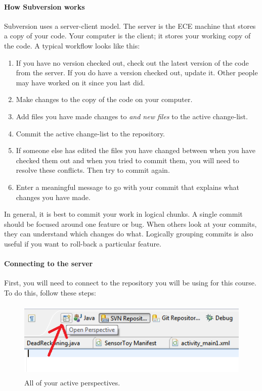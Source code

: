 \documentclass[10pt]{article}
\begin{document}
\paragraph{How Subversion works} Subversion uses a server-client model. The server is the ECE machine that stores a copy of your code. Your computer is the client; it stores your working copy of the code. A typical workflow looks like this:

\begin{enumerate}
\item If you have no version checked out, check out the latest version of the code from the server. If you do have a version checked out, update it. Other people may have worked on it since you last did.
\item Make changes to the copy of the code on your computer.
\item Add files you have made changes to \emph{and new files} to the active change-list.
\item Commit the active change-list to the repository.
\item If someone else has edited the files you have changed between when you have checked them out and when you tried to commit them, you will need to resolve these conflicts. Then try to commit again.
\item Enter a meaningful message to go with your commit that explains what changes you have made.
\end{enumerate}

In general, it is best to commit your work in logical chunks. A single commit should be focused around one feature or bug. When others look at your commits, they can understand which changes do what. Logically grouping commits is also useful if you want to roll-back a particular feature.

\paragraph{Connecting to the server} First, you will need to connect to the repository you will be using for this course. To do this, follow these steps:

\begin{figure}[htbp]
\begin{center}
\includegraphics[height=10em]{new-perspective.png}
\end{center}
\caption{\label{fig:new-perspective}All of your active perspectives.}
\end{figure}
\end{document}
